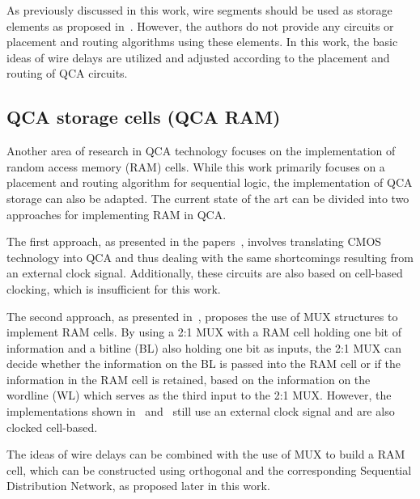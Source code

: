 As previously discussed in this work, wire segments should be used as storage elements as proposed in~\cite{Walter}. However, the authors do not provide any circuits or placement and routing algorithms using these elements. In this work, the basic ideas of wire delays are utilized and adjusted according to the placement and routing of QCA circuits.

\subsection{QCA storage cells (QCA RAM)}\label{subsec:RAM_SoA}
Another area of research in QCA technology focuses on the implementation of random access memory (RAM) cells. While this work primarily focuses on a placement and routing algorithm for sequential logic, the implementation of QCA storage can also be adapted. The current state of the art can be divided into two approaches for implementing RAM in QCA.

The first approach, as presented in the papers~\cite{RAM_overview, crosstalk, RAM_cell}, involves translating CMOS technology into QCA and thus dealing with the same shortcomings resulting from an external clock signal. Additionally, these circuits are also based on cell-based clocking, which is insufficient for this work.

The second approach, as presented in~\cite{ahmad2018optimal, majeed2019optimal}, proposes the use of MUX structures to implement RAM cells. By using a 2:1 MUX with a RAM cell holding one bit of information and a bitline (BL) also holding one bit as inputs, the 2:1 MUX can decide whether the information on the BL is passed into the RAM cell or if the information in the RAM cell is retained, based on the information on the wordline (WL) which serves as the third input to the 2:1 MUX. However, the implementations shown in~\cite{ahmad2018optimal} and~\cite{majeed2019optimal} still use an external clock signal and are also clocked cell-based.

The ideas of wire delays can be combined with the use of MUX to build a RAM cell, which can be constructed using orthogonal and the corresponding Sequential Distribution Network, as proposed later in this work.
